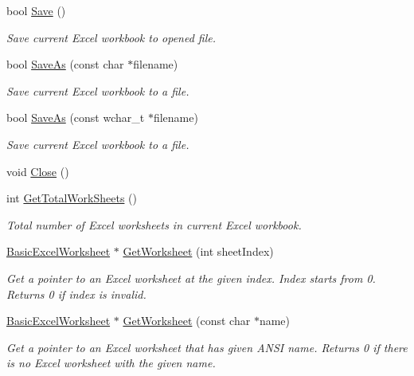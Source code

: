 \begin{DoxyCompactItemize}
bool \hyperlink{class_y_excel_1_1_basic_excel_acae9790120b1827808184d1bd7870765}{Save} ()
\begin{DoxyCompactList}\small\item\em Save current Excel workbook to opened file. \end{DoxyCompactList}\item 
bool \hyperlink{class_y_excel_1_1_basic_excel_aa74ad2c41158d036622cfd96c2adf586}{Save\+As} (const char $\ast$filename)
\begin{DoxyCompactList}\small\item\em Save current Excel workbook to a file. \end{DoxyCompactList}\item 
bool \hyperlink{class_y_excel_1_1_basic_excel_a5b6097ce4c4a07bf3f0cc9281d7b6ad2}{Save\+As} (const wchar\+\_\+t $\ast$filename)
\begin{DoxyCompactList}\small\item\em Save current Excel workbook to a file. \end{DoxyCompactList}\item 
void \hyperlink{class_y_excel_1_1_basic_excel_ae0ffc1f6832f34333714d515c4bc9ea9}{Close} ()
\item 
int \hyperlink{class_y_excel_1_1_basic_excel_ad9d06961e6c38fe49aafaf4b46950aee}{Get\+Total\+Work\+Sheets} ()
\begin{DoxyCompactList}\small\item\em Total number of Excel worksheets in current Excel workbook. \end{DoxyCompactList}\item 
\hyperlink{class_y_excel_1_1_basic_excel_worksheet}{Basic\+Excel\+Worksheet} $\ast$ \hyperlink{class_y_excel_1_1_basic_excel_ad1d740905525bdfb266b15c3537cf261}{Get\+Worksheet} (int sheet\+Index)
\begin{DoxyCompactList}\small\item\em Get a pointer to an Excel worksheet at the given index. Index starts from 0. Returns 0 if index is invalid. \end{DoxyCompactList}\item 
\hyperlink{class_y_excel_1_1_basic_excel_worksheet}{Basic\+Excel\+Worksheet} $\ast$ \hyperlink{class_y_excel_1_1_basic_excel_aabfe37c1515cd2ecbf73b8af37ca24bf}{Get\+Worksheet} (const char $\ast$name)
\begin{DoxyCompactList}\small\item\em Get a pointer to an Excel worksheet that has given A\+N\+S\+I name. Returns 0 if there is no Excel worksheet with the given name. \end{DoxyCompactList}\item 

\end{DoxyCompactItemize}
